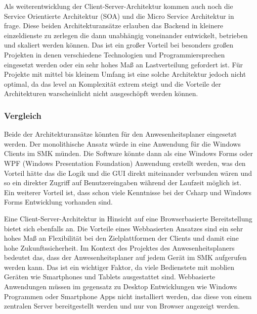 Als weiterentwicklung der Client-Server-Architektur kommen auch noch die Service Orientierte Architektur (SOA) und die Micro Service Architektur in frage. Diese beiden Architekturansätze erlauben das Backend in kleinere einzeldienste zu zerlegen die dann unabhängig voneinander entwickelt, betrieben und skaliert werden können. Das ist ein großer Vorteil bei besonders großen Projekten in denen verschiedene Technologien und Programmiersprechen eingesetzt werden oder ein sehr hohes Maß an Lastverteilung gefordert ist. Für Projekte mit mittel bis kleinem Umfang ist eine solche Architektur jedoch nicht optimal, da das level an Komplexität extrem steigt und die Vorteile der Architekturen warscheinlicht nicht ausgeschöpft werden können.

\subsubsection{Vergleich}
\label{sec:Vergleich}
Beide der Architekturansätze könnten für den Anwesenheitsplaner eingesetzt werden. Der monolithische Ansatz würde in eine Anwendung für die Windows Clients im SMK münden. Die Software könnte dann als eine Windows Forms oder WPF (Windows Presentation Foundation) Anwendung erstellt werden, was den Vorteil hätte das die Logik und die GUI direkt miteinander verbunden wären und so ein direkter Zugriff auf Benutzereingaben während der Laufzeit möglich ist. Ein weiterer Vorteil ist, dass schon viele Kenntnisse bei der Csharp und Windows Forms Entwicklung vorhanden sind.%

Eine Client-Server-Architektur in Hinsicht auf eine Browserbasierte Bereitstellung bietet sich ebenfalls an. Die Vorteile eines Webbasierten Ansatzes sind ein sehr hohes Maß an Flexibilität bei den Zielplattformen der Clients und damit eine hohe Zukunftssicherheit. Im Kontext des Projektes des Anwesenheitsplaners bedeutet das, dass der Anwesenheitsplaner auf jedem Gerät im SMK aufgerufen werden kann. Das ist ein wichtiger Faktor, da viele Bedienstete mit moblien Geräten wie Smartphones und Tablets ausgestattet sind. Webbasierte Anwendungen müssen im gegensatz zu Desktop Entwicklungen wie Windows Programmen oder Smartphone Apps nicht installiert werden, das diese von einem zentralen Server bereitgestellt werden und nur von Browser angezeigt werden.

